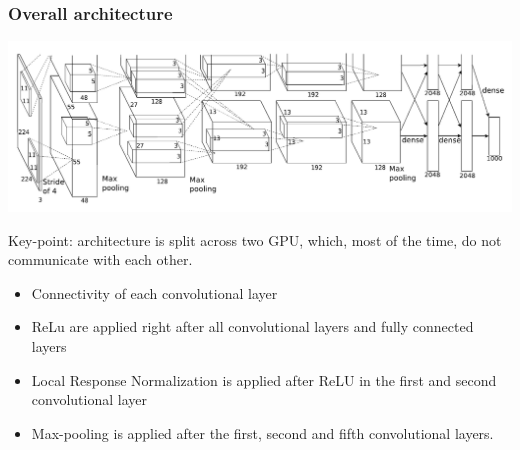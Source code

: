 \begin{frame}
	\frametitle{Overall architecture}



	\begin{center}
		\includegraphics[scale=0.6]{figs/AlexNet_twoGPU_architecture}
	\end{center}

	Key-point: architecture is split across two GPU, which, most of the time, do not communicate with each other.

	\begin{itemize}
		\item Connectivity of each convolutional layer
		\item ReLu are applied right after all convolutional layers and fully connected layers
		\item Local Response Normalization is applied after ReLU in the first and second convolutional layer
		\item Max-pooling is applied after the first, second and fifth convolutional layers.
	\end{itemize}



\end{frame}

